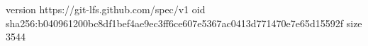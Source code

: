 version https://git-lfs.github.com/spec/v1
oid sha256:b040961200bc8df1bef4ae9ec3ff6ce607e5367ac0413d771470e7e65d15592f
size 3544
